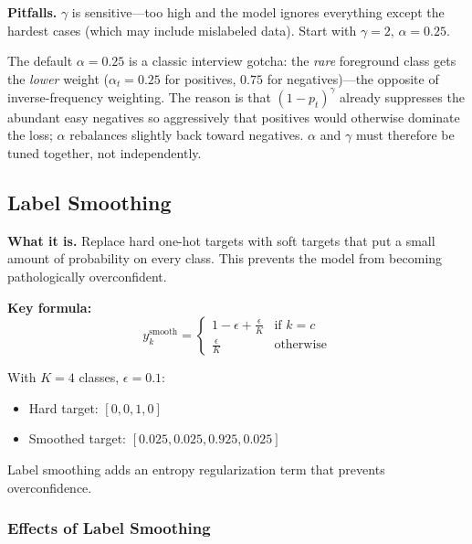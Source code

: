 \textbf{Pitfalls.} $\gamma$ is sensitive---too high and the model ignores everything except the hardest cases (which may include mislabeled data). Start with $\gamma = 2$, $\alpha = 0.25$.

\begin{keyinsight}
The default $\alpha = 0.25$ is a classic interview gotcha: the \textit{rare} foreground class gets the \textit{lower} weight ($\alpha_t = 0.25$ for positives, $0.75$ for negatives)---the opposite of inverse-frequency weighting. The reason is that $(1-p_t)^\gamma$ already suppresses the abundant easy negatives so aggressively that positives would otherwise dominate the loss; $\alpha$ rebalances slightly back toward negatives. $\alpha$ and $\gamma$ must therefore be tuned together, not independently.
\end{keyinsight}

\subsection{Label Smoothing}

\textbf{What it is.} Replace hard one-hot targets with soft targets that put a small amount of probability on every class. This prevents the model from becoming pathologically overconfident.

\textbf{Key formula:}
\begin{equation}
y_k^{\text{smooth}} = \begin{cases}
1 - \epsilon + \frac{\epsilon}{K} & \text{if } k = c \\
\frac{\epsilon}{K} & \text{otherwise}
\end{cases}
\end{equation}

\begin{example}
With $K=4$ classes, $\epsilon=0.1$:
\begin{itemize}
    \item Hard target: $[0, 0, 1, 0]$
    \item Smoothed target: $[0.025, 0.025, 0.925, 0.025]$
\end{itemize}
\end{example}

Label smoothing adds an entropy regularization term that prevents overconfidence.

\subsubsection{Effects of Label Smoothing}

